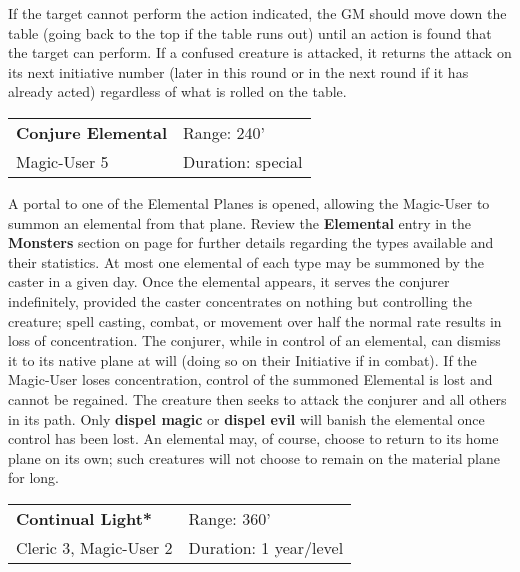 \documentclass[a4paper,twoside,openany,10pt]{book}
\begin{document}
\begin{multicols}{2}
If the target cannot perform the action indicated, the GM should move down the table (going back to the top if the table runs out) until an action is found that the target can perform. If a confused creature is attacked, it returns the attack on its next initiative number (later in this round or in the next round if it has already acted) regardless of what is rolled on the table.

\smallskip\begin{flushleft} 
	\begin{tabularx}{0.45\textwidth}{@{}m{3.7cm}m{5.5cm}@{}} 
		\textbf{Conjure Elemental} & Range: 240'\\
		Magic-User 5 & Duration: special\\	
	\end{tabularx}\end{flushleft}

A portal to one of the Elemental Planes is opened, allowing the Magic-User to summon an elemental from that plane. Review the \textbf{Elemental} entry in the \textbf{Monsters} section on page \hyperlink{elemental}{\pageref{elemental}} for further details regarding the types available and their statistics. At most one elemental of each type may be summoned by the caster in a given day. Once the elemental appears, it serves the conjurer indefinitely, provided the caster concentrates on nothing but controlling the creature; spell casting, combat, or movement over half the normal rate results in loss of concentration. The conjurer, while in control of an elemental, can dismiss it to its native plane at will (doing so on their Initiative if in combat). If the Magic-User loses concentration, control of the summoned Elemental is lost and cannot be regained. The creature then seeks to attack the conjurer and all others in its path. Only \textbf{dispel magic} or \textbf{dispel evil} will banish the elemental once control has been lost. An elemental may, of course, choose to return to its home plane on its own; such creatures will not choose to remain on the material plane for long.

\smallskip\begin{flushleft} 
	\begin{tabularx}{0.45\textwidth}{@{}m{3.5cm}m{5.5cm}@{}} 
		\textbf{Continual Light*} & Range: 360'\\
		Cleric 3, Magic-User 2 & Duration: 1 year/level\\
	\end{tabularx}\end{flushleft}


\end{multicols}
\end{document}
